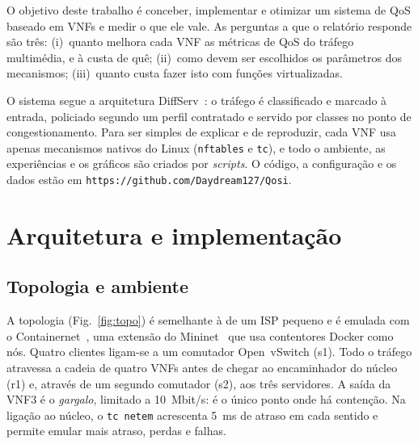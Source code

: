 \documentclass[a4paper]{llncs}
\begin{document}
O objetivo deste trabalho é conceber, implementar e otimizar um sistema de QoS baseado
em VNFs e medir o que ele vale. As perguntas a que o relatório responde são três:
(i)~quanto melhora cada VNF as métricas de QoS do tráfego multimédia, e à custa de
quê; (ii)~como devem ser escolhidos os parâmetros dos mecanismos; (iii)~quanto custa
fazer isto com funções virtualizadas.

O sistema segue a arquitetura DiffServ~\cite{rfc2475}: o tráfego é classificado e
marcado à entrada, policiado segundo um perfil contratado e servido por classes no
ponto de congestionamento. Para ser simples de explicar e de reproduzir, cada VNF usa
apenas mecanismos nativos do Linux (\texttt{nftables} e \texttt{tc}), e todo o
ambiente, as experiências e os gráficos são criados por \emph{scripts}. O código, a
configuração e os dados estão em \texttt{https://github.com/Daydream127/Qosi}.

\section{Arquitetura e implementação}
\label{sec:arq}

\subsection{Topologia e ambiente}

A topologia (Fig.~\ref{fig:topo}) é semelhante à de um ISP pequeno e é emulada com o
Containernet~\cite{containernet}, uma extensão do Mininet~\cite{mininet} que usa
contentores Docker como nós. Quatro clientes ligam-se a um comutador Open~vSwitch
(s1). Todo o tráfego atravessa a cadeia de quatro VNFs antes de chegar ao encaminhador
do núcleo (r1) e, através de um segundo comutador (s2), aos três servidores. A saída
da VNF3 é o \emph{gargalo}, limitado a 10~Mbit/s: é o único ponto onde há contenção.
Na ligação ao núcleo, o \texttt{tc netem} acrescenta 5~ms de atraso em cada sentido e
permite emular mais atraso, perdas e falhas.
\end{document}
